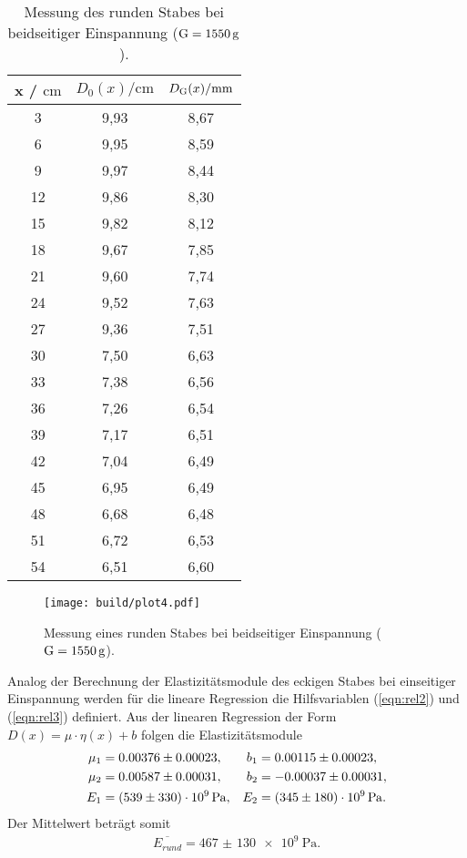 \sloppy
\begin{table}[H]
  \centering
  \caption{Messung des runden Stabes bei beidseitiger Einspannung ($\text G = \SI{1550}{\gram}$).}
  \label{tab:werte4}
  \begin{tabular}{c c c}
    \toprule
    x / $\si{\centi\meter} $ & $ D_0(x) / \si{\centi\meter}$ & $D_{\text G}(x) / \si{\milli\meter}$ \\
    \midrule
    3 & 9,93 & 8,67 \\
    6 & 9,95 & 8,59 \\
    9 & 9,97 & 8,44 \\
    12 & 9,86 & 8,30 \\
    15 & 9,82 & 8,12 \\
    18 & 9,67 & 7,85 \\
    21 & 9,60 & 7,74 \\
    24 & 9,52 & 7,63 \\
    27 & 9,36 & 7,51 \\
    30 & 7,50 & 6,63 \\
    33 & 7,38 & 6,56 \\
    36 & 7,26 & 6,54 \\
    39 & 7,17 & 6,51 \\
    42 & 7,04 & 6,49 \\
    45 & 6,95 & 6,49 \\
    48 & 6,68 & 6,48 \\
    51 & 6,72 & 6,53 \\
    54 & 6,51 & 6,60 \\
    \bottomrule
  \end{tabular}
\end{table}

\sloppy
\begin{figure}
  \centering
  \texttt{[image: build/plot4.pdf]}
  \caption{Messung eines runden Stabes bei beidseitiger Einspannung ($\text G = \SI{1550}{\gram}$).}
  \label{fig:plot4}
\end{figure}


Analog der Berechnung der Elastizitätsmodule des eckigen Stabes bei einseitiger Einspannung werden für die lineare Regression die 
Hilfsvariablen (\ref{eqn:rel2}) und (\ref{eqn:rel3}) definiert. Aus der linearen Regression der Form $D(x) = \mu\cdot\eta(x)+b$
folgen die Elastizitätsmodule
\begin{align*}
  \mu_1 &= 0.00376 \pm 0.00023, & b_1 &= 0.00115 \pm 0.00023, \\
  \mu_2 &= 0.00587 \pm 0.00031, & b_2 &= -0.00037 \pm 0.00031, \\
  E_1 &= \SI{539 (330)e9}{\Pa}, & E_2 &= \SI{345 (180)e9}{\Pa}.\\
\end{align*}
Der Mittelwert beträgt somit
\begin{align*}
  \overline{E_{rund}} = \SI{467(130)e9}{\Pa}.
\end{align*}